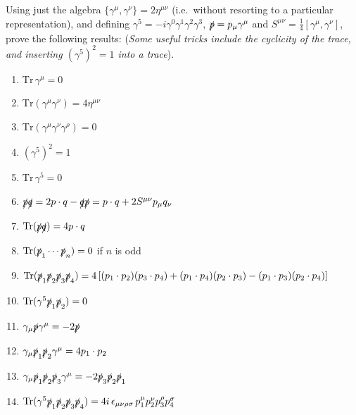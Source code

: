 Using just the algebra $\{\gamma^\mu, \gamma^\nu\} = 2\eta^{\mu\nu}$ (i.e.\ without resorting to a particular representation), and defining $\gamma^5 = -i\gamma^0\gamma^1\gamma^2\gamma^3$, $\slashed{p} = p_\mu\gamma^\mu$ and $S^{\mu\nu} = \frac{1}{4}[\gamma^\mu, \gamma^\nu]$, prove the following results: (\textit{Some useful tricks include the cyclicity of the trace, and inserting $(\gamma^5)^2 = 1$ into a trace}).
\begin{enumerate}[label=\roman*.]
    \item $\mathrm{Tr}\,\gamma^\mu = 0$
    \item $\mathrm{Tr}(\gamma^\mu\gamma^\nu) = 4\eta^{\mu\nu}$
    \item $\mathrm{Tr}(\gamma^\mu\gamma^\nu\gamma^\rho) = 0$
    \item $(\gamma^5)^2 = 1$
    \item $\mathrm{Tr}\,\gamma^5 = 0$
    \item $\slashed{p}\slashed{q} = 2p\cdot q - \slashed{q}\slashed{p} = p\cdot q + 2S^{\mu\nu}p_\mu q_\nu$
    \item $\mathrm{Tr}(\slashed{p}\slashed{q}) = 4p\cdot q$
    \item $\mathrm{Tr}(\slashed{p}_1\cdots\slashed{p}_n) = 0$ if $n$ is odd
    \item $\mathrm{Tr}(\slashed{p}_1\slashed{p}_2\slashed{p}_3\slashed{p}_4) = 4\left[(p_1\cdot p_2)(p_3\cdot p_4) + (p_1\cdot p_4)(p_2\cdot p_3) - (p_1\cdot p_3)(p_2\cdot p_4)\right]$
    \item $\mathrm{Tr}(\gamma^5\slashed{p}_1\slashed{p}_2) = 0$
    \item $\gamma_\mu\slashed{p}\gamma^\mu = -2\slashed{p}$
    \item $\gamma_\mu\slashed{p}_1\slashed{p}_2\gamma^\mu = 4p_1\cdot p_2$
    \item $\gamma_\mu\slashed{p}_1\slashed{p}_2\slashed{p}_3\gamma^\mu = -2\slashed{p}_3\slashed{p}_2\slashed{p}_1$
    \item $\mathrm{Tr}(\gamma^5\slashed{p}_1\slashed{p}_2\slashed{p}_3\slashed{p}_4) = 4i\,\epsilon_{\mu\nu\rho\sigma}\,p_1^\mu p_2^\nu p_3^\rho p_4^\sigma$
\end{enumerate}

